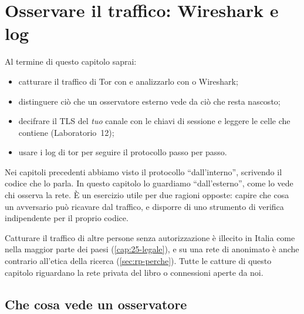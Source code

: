 \chapter{Osservare il traffico: Wireshark e log}\label{cap:20-traffico}

\begin{obiettivi}
Al termine di questo capitolo saprai:
\begin{itemize}[nosep]
  \item catturare il traffico di Tor con  e analizzarlo con  o Wireshark;
  \item distinguere ciò che un osservatore esterno vede da ciò che resta nascosto;
  \item decifrare il TLS del \emph{tuo} canale con le chiavi di sessione e leggere le celle che contiene (Laboratorio~12);
  \item usare i log di tor per seguire il protocollo passo per passo.
\end{itemize}
\end{obiettivi}

Nei capitoli precedenti abbiamo visto il protocollo \enquote{dall'interno}, scrivendo il codice che lo parla. In questo capitolo lo guardiamo \enquote{dall'esterno}, come lo vede chi osserva la rete. È un esercizio utile per due ragioni opposte: capire che cosa un avversario può ricavare dal traffico, e disporre di uno strumento di verifica indipendente per il proprio codice.

\begin{attenzione}
Catturare il traffico di altre persone senza autorizzazione è illecito in Italia come nella maggior parte dei paesi (\cref{cap:25-legale}), e su una rete di anonimato è anche contrario all'etica della ricerca (\cref{sec:rp-perche}). Tutte le catture di questo capitolo riguardano la rete privata del libro o connessioni aperte da noi.
\end{attenzione}

\section{Che cosa vede un osservatore}\label{sec:traffico-osservatore}

